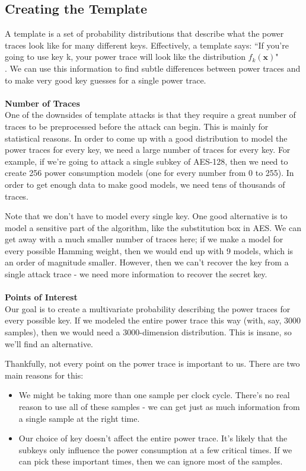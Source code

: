 \subsection{Creating the Template}
    A template is a set of probability distributions that describe what the
    power traces look like for many different keys. Effectively, a template
    says: ``If you're going to use key k, your power trace will look like the
    distribution $f_k(\mathbf{x})$"\\
    . We can use this information to find subtle differences between power
    traces and to make very good key guesses for a single power trace.\\
    \\
    \textbf{Number of Traces}\\
    One of the downsides of template attacks is that they require a great number
    of traces to be preprocessed before the attack can begin. This is mainly for
    statistical reasons. In order to come up with a good distribution to model
    the power traces for every key, we need a large number of traces for every
    key. For example, if we're going to attack a single subkey of AES-128, then
    we need to create 256 power consumption models (one for every number from 0
    to 255). In order to get enough data to make good models, we need tens of
    thousands of traces.
    
    Note that we don't have to model every single key. One good alternative is
    to model a sensitive part of the algorithm, like the substitution box in
    AES. We can get away with a much smaller number of traces here; if we make a
    model for every possible Hamming weight, then we would end up with 9 models,
    which is an order of magnitude smaller. However, then we can't recover the
    key from a single attack trace - we need more information to recover the
    secret key.\\
    \\
    \textbf{Points of Interest}\\
    Our goal is to create a multivariate probability describing the power traces
    for every possible key. If we modeled the entire power trace this way (with,
    say, 3000 samples), then we would need a 3000-dimension distribution. This
    is insane, so we'll find an alternative.
    
    Thankfully, not every point on the power trace is important to us. There are
    two main reasons for this:
    \begin{itemize}
      \item We might be taking more than one sample per clock cycle.  There's no
      real reason to use all of these samples - we can get just as much
      information from a single sample at the right time.
      \item Our choice of key doesn't affect the entire power trace. It's likely
      that the subkeys only influence the power consumption at a few critical
      times. If we can pick these important times, then we can ignore most of
      the samples. 
    \end{itemize}
    
